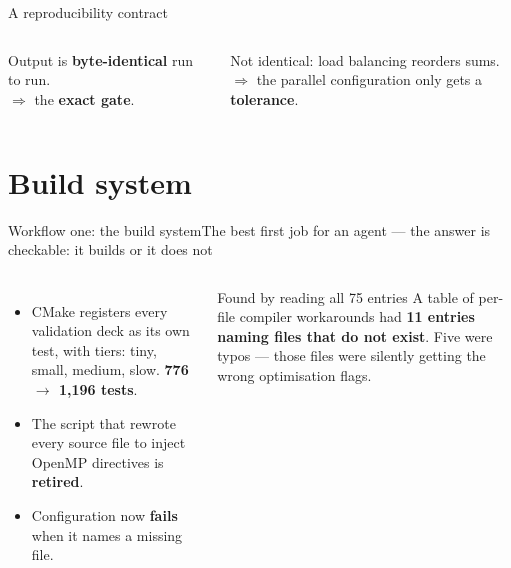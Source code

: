 \documentclass[aspectratio=169]{beamer}
\begin{document}
\begin{frame}{A reproducibility contract}
  \begin{columns}[T,onlytextwidth]
      \begin{cookiecard}[title={1 rank, 1 thread}]
        Output is \textbf{byte-identical} run to run.\\[.5em]
        $\Rightarrow$ the \textbf{exact gate}.
      \end{cookiecard}
      \begin{cookiecard}[title=2 ranks]
        Not identical: load balancing reorders sums.\\[.4em]
        $\Rightarrow$ the parallel configuration only gets a \textbf{tolerance}.
      \end{cookiecard}
  \end{columns}
\end{frame}

\section{Build system}

\begin{frame}{Workflow one: the build system}{The best first job for an agent --- the answer is checkable: it builds or it does not}
  \begin{columns}[T,onlytextwidth]
      \begin{itemize}\setlength\itemsep{5pt}
        \item CMake registers every validation deck as its own test, with tiers: tiny, small, medium, slow. \textbf{776 $\to$ 1,196 tests}.
        \item The script that rewrote every source file to inject OpenMP directives is \textbf{retired}.
        \item Configuration now \textbf{fails} when it names a missing file.
      \end{itemize}
      \begin{alertblock}{Found by reading all 75 entries}
        A table of per-file compiler workarounds had \textbf{11 entries naming files that do not exist}. Five were typos --- those files were silently getting the wrong optimisation flags.
      \end{alertblock}
  \end{columns}
\end{frame}
\end{document}
